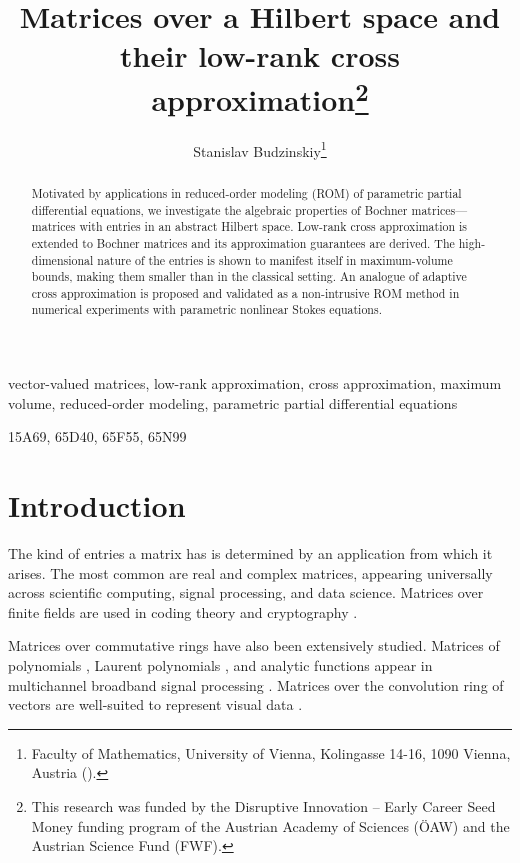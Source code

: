 \documentclass[onefignum,onetabnum]{siamart250211}
\title{Matrices over a Hilbert space and their low-rank cross approximation\thanks{This research was funded by the Disruptive Innovation – Early Career Seed Money funding program of the Austrian Academy of Sciences (\"OAW) and the Austrian Science Fund (FWF).}}
\author{
Stanislav Budzinskiy\thanks{Faculty of Mathematics, University of Vienna, Kolingasse 14-16, 1090 Vienna, Austria (\email{stanislav.budzinskiy\allowbreak@univie.ac.at}).}
}
\begin{document}
\maketitle

\begin{abstract}
Motivated by applications in reduced-order modeling (ROM) of parametric partial differential equations, we investigate the algebraic properties of Bochner matrices---matrices with entries in an abstract Hilbert space.
Low-rank cross approximation is extended to Bochner matrices and its approximation guarantees are derived.
The high-dimensional nature of the entries is shown to manifest itself in maximum-volume bounds, making them smaller than in the classical setting.
An analogue of adaptive cross approximation is proposed and validated as a non-intrusive ROM method in numerical experiments with parametric nonlinear Stokes equations.
\end{abstract}

\begin{keywords}
vector-valued matrices, low-rank approximation, cross approximation, maximum volume, reduced-order modeling, parametric partial differential equations
\end{keywords}

\begin{MSCcodes}
15A69, 65D40, 65F55, 65N99 
\end{MSCcodes}

\section{Introduction}
The kind of entries a matrix has is determined by an application from which it arises.
The most common are real and complex matrices, appearing universally across scientific computing, signal processing, and data science.
Matrices over finite fields \cite[Ch.~7]{hachenberger2020matrices} are used in coding theory \cite{silva2010communication} and cryptography \cite{kleinjung2010factorization}.

Matrices over commutative rings \cite{brown1992matrices} have also been extensively studied.
Matrices of polynomials \cite{foster2009algorithm}, Laurent polynomials \cite{cescato2010qr}, and analytic functions \cite{bunse1991numerical, weiss2024properties} appear in multichannel broadband signal processing \cite{neo2023polynomial}.
Matrices over the convolution ring of vectors \cite{kilmer2011factorization, kilmer2013third, mor2025quasitubal} are well-suited to represent visual data \cite{dian2019hyperspectral}.
\end{document}
